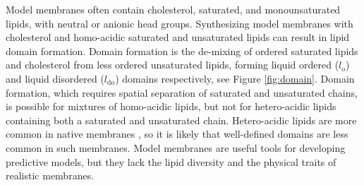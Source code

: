 \documentclass[12pt]{ruthesis_nofloat}
\newcommand{\lo}{l_{\mathrm{o}}}
\newcommand{\ldo}{l_{\mathrm{do}}}
\newcommand{\nachr}{nAChR}
\newcommand{\plgic}{pLGIC}
\begin{document}
Model membranes often contain cholesterol, saturated, and monounsaturated lipids, with neutral or anionic head groups. Synthesizing model membranes with cholesterol and homo-acidic saturated and unsaturated lipids can result in lipid domain formation. Domain formation is the de-mixing of ordered saturated lipids and cholesterol from less ordered unsaturated lipids, forming liquid ordered ($\lo$) and liquid disordered ($\ldo$) domains respectively\citep{Kaiser2009,Lingwood2010}, see Figure \ref{fig:domain}. Domain formation, which requires spatial separation of saturated and unsaturated chains, is possible for mixtures of homo-acidic lipids, but not for hetero-acidic lipids containing both a saturated and unsaturated chain.  Hetero-acidic lipids are more common in native membranes \citep{Isolated1969, Breckenridge1973,Barrantes1989a,Taguchi2010,Quesada2016,Ingolfsson2017b,Lorent2020}, so it is likely that well-defined domains are less common in such membranes. Model membranes are useful tools for developing predictive models, but they lack the lipid diversity and the physical traits of realistic membranes.

\end{document}
